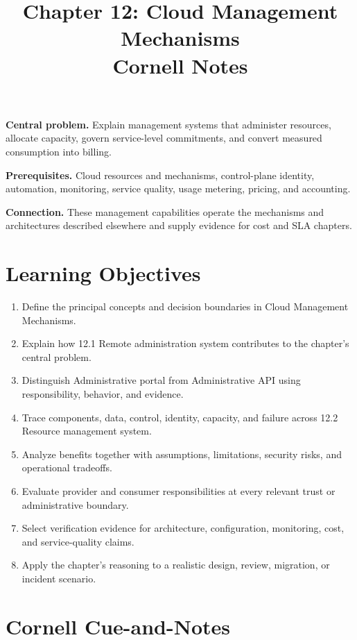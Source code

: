 \documentclass[11pt]{article}
\title{Chapter 12: Cloud Management Mechanisms\\[2mm]\large Cornell Notes}
\author{}
\date{}
\begin{document}
\maketitle
\thispagestyle{fancy}
\vspace{-1.5em}
\begin{orientationbox}
\textbf{Central problem.} Explain management systems that administer resources, allocate capacity, govern service-level commitments, and convert measured consumption into billing.\par\smallskip
\textbf{Prerequisites.} Cloud resources and mechanisms, control-plane identity, automation, monitoring, service quality, usage metering, pricing, and accounting.\par\smallskip
\textbf{Connection.} These management capabilities operate the mechanisms and architectures described elsewhere and supply evidence for cost and SLA chapters.
\end{orientationbox}
\section{Learning Objectives}
\begin{enumerate}
\item Define the principal concepts and decision boundaries in Cloud Management Mechanisms.
\item Explain how 12.1 Remote administration system contributes to the chapter's central problem.
\item Distinguish Administrative portal from Administrative API using responsibility, behavior, and evidence.
\item Trace components, data, control, identity, capacity, and failure across 12.2 Resource management system.
\item Analyze benefits together with assumptions, limitations, security risks, and operational tradeoffs.
\item Evaluate provider and consumer responsibilities at every relevant trust or administrative boundary.
\item Select verification evidence for architecture, configuration, monitoring, cost, and service-quality claims.
\item Apply the chapter's reasoning to a realistic design, review, migration, or incident scenario.
\end{enumerate}
\section{Cornell Cue-and-Notes}
\end{document}
